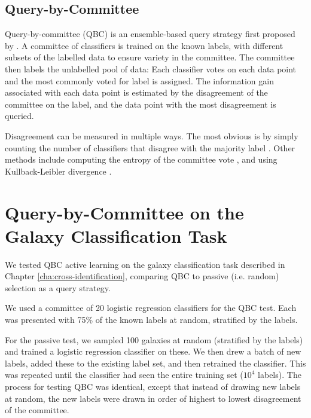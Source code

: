 

    \subsection{Query-by-Committee}
    \label{sec:qbc}

        Query-by-committee (QBC) is an ensemble-based query strategy first
        proposed by \citet{seung92}. A committee of classifiers is trained on
        the known labels, with different subsets of the labelled data to ensure
        variety in the committee. The committee then labels the unlabelled pool
        of data: Each classifier votes on each data point and the most commonly
        voted for label is assigned. The information gain associated with each
        data point is estimated by the disagreement of the committee on the
        label, and the data point with the most disagreement is queried.

        Disagreement can be measured in multiple ways. The most obvious is by
        simply counting the number of classifiers that disagree with the
        majority label \citep{seung92}. Other methods include computing the
        entropy of the committee vote \citep{mccallum98, dagan95}, and using
        Kullback-Leibler divergence \citep{mccallum98}.

\section{Query-by-Committee on the Galaxy Classification Task}
\label{sec:rgz-qbc}

    We tested QBC active learning on the galaxy classification task described in
    Chapter \ref{cha:cross-identification}, comparing QBC to passive (i.e.
    random) selection as a query strategy.

    We used a committee of 20 logistic regression classifiers for the QBC test.
    Each was presented with 75\% of the known labels at random, stratified by
    the labels.

    For the passive test, we sampled 100 galaxies at random (stratified by the
    labels) and trained a logistic regression classifier on these. We then drew
    a batch of new labels, added these to the existing label set, and then
    retrained the classifier. This was repeated until the classifier had seen
    the entire training set ($10^4$ labels). The process for testing QBC was
    identical, except that instead of drawing new labels at random, the new
    labels were drawn in order of highest to lowest disagreement of the
    committee.

